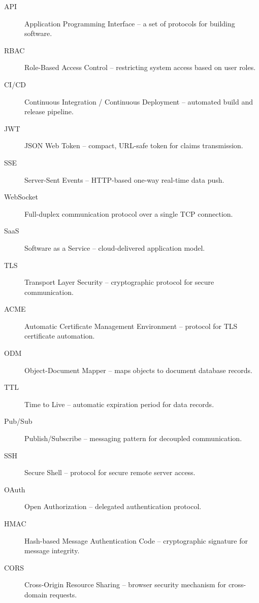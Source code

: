 \documentclass[12pt,a4paper,twoside]{report}
\begin{document}
\begin{description}
  \item[API] Application Programming Interface -- a set of protocols for building software.
  \item[RBAC] Role-Based Access Control -- restricting system access based on user roles.
  \item[CI/CD] Continuous Integration / Continuous Deployment -- automated build and release pipeline.
  \item[JWT] JSON Web Token -- compact, URL-safe token for claims transmission.
  \item[SSE] Server-Sent Events -- HTTP-based one-way real-time data push.
  \item[WebSocket] Full-duplex communication protocol over a single TCP connection.
  \item[SaaS] Software as a Service -- cloud-delivered application model.
  \item[TLS] Transport Layer Security -- cryptographic protocol for secure communication.
  \item[ACME] Automatic Certificate Management Environment -- protocol for TLS certificate automation.
  \item[ODM] Object-Document Mapper -- maps objects to document database records.
  \item[TTL] Time to Live -- automatic expiration period for data records.
  \item[Pub/Sub] Publish/Subscribe -- messaging pattern for decoupled communication.
  \item[SSH] Secure Shell -- protocol for secure remote server access.
  \item[OAuth] Open Authorization -- delegated authentication protocol.
  \item[HMAC] Hash-based Message Authentication Code -- cryptographic signature for message integrity.
  \item[CORS] Cross-Origin Resource Sharing -- browser security mechanism for cross-domain requests.
\end{description}
\end{document}
